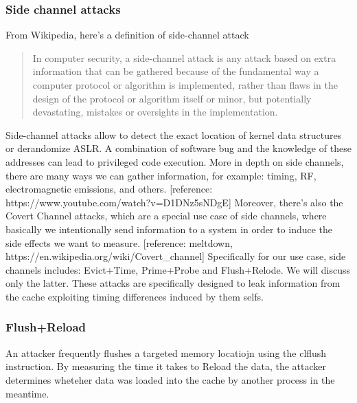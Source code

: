 \subsubsection{Side channel attacks}
From Wikipedia, here's a definition of side-channel attack
\begin{quotation}
    In computer security, a side-channel attack is any attack based on extra
    information that can be gathered because of the fundamental way a computer
    protocol or algorithm is implemented, rather than flaws in the design of the
    protocol or algorithm itself or minor, but potentially devastating, mistakes
    or oversights in the implementation.
\end{quotation}
Side-channel attacks allow to detect the exact location of kernel data structures or derandomize ASLR. A combination of
software bug and the knowledge of these addresses can lead to privileged code execution.
More in depth on side channels, there are many ways we can gather information, for example: timing, RF, electromagnetic emissions, and others.
[reference: https://www.youtube.com/watch?v=D1DNz5sNDgE]
Moreover, there's also the Covert Channel attacks, which are a special use case of side channels, where basically we intentionally send information
to a system in order to induce the side effects we want to measure.
[reference: meltdown, https://en.wikipedia.org/wiki/Covert_channel]
Specifically for our use case, side channels includes: Evict+Time, Prime+Probe and Flush+Relode. We will discuss only the latter.
These attacks are specifically designed to leak information from the cache exploiting timing differences induced by them selfs.
\subsubsection{Flush+Reload}
An attacker frequently flushes a targeted memory locatiojn using the clflush instruction. By measuring the time it takes to Reload
the data, the attacker determines wheteher data was loaded into the cache by another process in the meantime.



